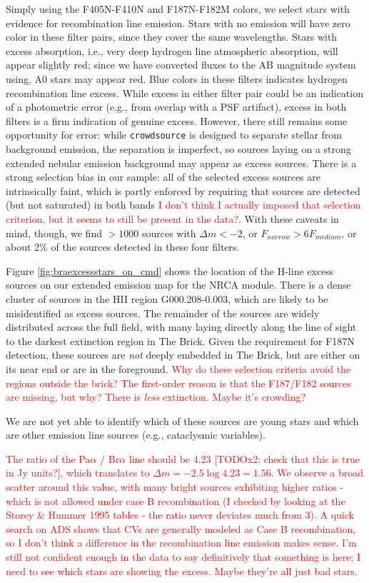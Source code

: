 \documentclass[times,astrosymb]{aastex631}
\def\todo#1{\textcolor{red}{#1}}
\begin{document}
Simply using the F405N-F410N and F187N-F182M colors, we select stars with evidence for recombination line emission.
Stars with no emission will have zero color in these filter pairs, since they cover the same wavelengths.
Stars with excess absorption, i.e., very deep hydrogen line atmospheric absorption, will appear slightly red; since we have converted fluxes to the AB magnitude system using, A0 stars may appear red.
Blue colors in these filters indicates hydrogen recombination line excess.
While excess in either filter pair could be an indication of a photometric error (e.g., from overlap with a PSF artifact), excess in both filters is a firm indication of genuine excess.
However, there still remains some opportunity for error: while \texttt{crowdsource} is designed to separate stellar from background emission, the separation is imperfect, so sources laying on a strong extended nebular emission background may appear as excess sources.
There is a strong selection bias in our sample: all of the selected excess sources are intrinsically faint, which is partly enforced by requiring that sources are detected (but not saturated) in both bands \todo{I don't think I actually imposed that selection criterion, but it seems to still be present in the data?}.
With these caveats in mind, though, we find $>1000$ sources with $\Delta m < -2$, or $F_{narrow} > 6 F_{medium}$, or about 2\% of the sources detected in these four filters.

Figure \ref{fig:braexcessstars_on_cmd} shows the location of the H-line excess sources on our extended emission map for the NRCA module.
There is a dense cluster of sources in the HII region G000.208-0.003, which are likely to be misidentified as excess sources.
The remainder of the sources are widely distributed across the full field, with many laying directly along the line of sight to the darkest extinction region in The Brick.
Given the requirement for F187N detection, these sources are \emph{not} deeply embedded in The Brick, but are either on its near end or are in the foreground.
\todo{Why do these selection criteria avoid the regions outside the brick?
The first-order reason is that the F187/F182 sources are missing, but why?
There is \emph{less} extinction.
Maybe it's crowding?
}

We are not yet able to identify which of these sources are young stars and which are other emission line sources (e.g., cataclysmic variables).

\todo{The ratio of the Pa$\alpha$ / Br$\alpha$ line should be 4.23 \citep[][Table 14.2]{Draine2011} [TODOx2: check that this is true in Jy units?], which translates to $\Delta m = -2.5 \log 4.23 = 1.56$.
We observe a broad scatter around this value, with many bright sources exhibiting higher ratios - which is not allowed under case B recombination (I checked by looking at the Storey \& Hummer 1995 tables -  the ratio never deviates much from 3).
A quick search on ADS shows that CVs are generally modeled as Case B recombination, so I don't think a difference in the recombination line emission makes sense.
I'm still not confident enough in the data to say definitively that something is here;
I need to see which stars are showing the excess.  Maybe they're all just bad stars.
}
\end{document}
